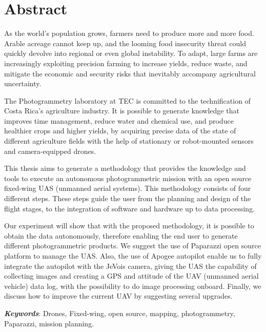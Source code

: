 \section*{Abstract}
As the world’s population grows, farmers need to produce more and more food. Arable acreage cannot keep up, and the looming food insecurity threat could quickly devolve into regional or even global instability. To adapt, large farms are increasingly exploiting precision farming to increase yields, reduce waste, and mitigate the economic and security risks that inevitably accompany agricultural uncertainty.

The  Photogrammetry laboratory at TEC is committed to the technification of  Costa Rica's agriculture industry. It is possible to generate knowledge that improves time management, reduce water and chemical use, and produce healthier crops and higher yields, by acquiring precise data of the state of different agriculture fields with the help of stationary or robot-mounted sensors and camera-equipped drones.


This thesis aims to generate a methodology that provides the knowledge and tools to execute an autonomous photogrammetric mission with an open source fixed-wing UAS (unmanned aerial systems).  This methodology consists of four different steps. These steps guide the user from the planning and design of the flight stages, to the integration of software and hardware up to data processing.

Our experiment will show that with the proposed methodology, it is possible to obtain the data autonomously, therefore enabling the end user to generate different photogrammetric products. We suggest the use of Paparazzi open source platform to manage the UAS. Also, the use of  Apogee autopilot enable us to fully integrate the autopilot with the JeVois camera, giving the UAS the capability of collecting images and creating a GPS and attitude of the UAV (unmanned aerial vehicle) data log, with the possibility to do image processing onboard.
Finally, we discuss how to improve the current UAV by suggesting several upgrades.

\textbf{\textit{Keywords}}: Drones, Fixed-wing, open source, mapping, photogrammetry, Paparazzi, mission planning.